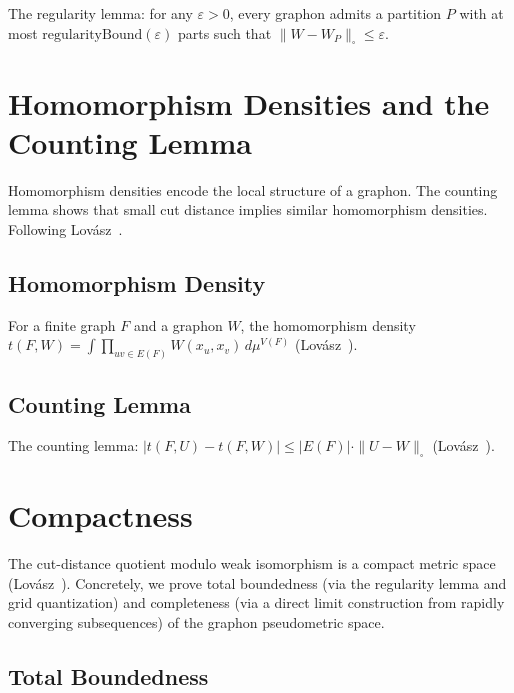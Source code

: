 The regularity lemma: for any $\varepsilon > 0$, every graphon admits a
partition $P$ with at most $\mathrm{regularityBound}(\varepsilon)$ parts such that
$\|W - W_P\|_\square \le \varepsilon$.



\chapter{Homomorphism Densities and the Counting Lemma}

Homomorphism densities encode the local structure of a graphon.
The counting lemma shows that small cut distance implies similar
homomorphism densities.  Following
Lov\'asz~\cite[Chapter~5 and Section~10.1]{lovasz2012}.

\section{Homomorphism Density}

For a finite graph $F$ and a graphon $W$, the homomorphism density
$t(F, W) = \int \prod_{uv \in E(F)} W(x_u, x_v) \, d\mu^{V(F)}$
(Lov\'asz~\cite[Equation~(5.29)]{lovasz2012}).


\section{Counting Lemma}

The counting lemma: $|t(F, U) - t(F, W)| \le |E(F)| \cdot \|U - W\|_\square$
(Lov\'asz~\cite[Lemma~10.23]{lovasz2012}).



\chapter{Compactness}

The cut-distance quotient modulo weak isomorphism is a compact metric space
(Lov\'asz~\cite[Theorem~9.23]{lovasz2012}).  Concretely, we prove total
boundedness (via the regularity lemma and grid quantization) and
completeness (via a direct limit construction from rapidly converging
subsequences) of the graphon pseudometric space.

\section{Total Boundedness}

